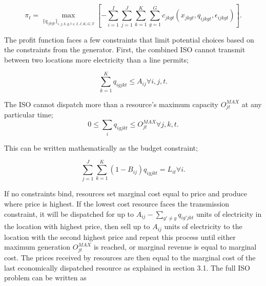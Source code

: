 \documentclass[12pt]{article}
\begin{document}
\begin{equation}
\pi_{t}=\max_{\{q_{ijkgt}\}_{i,j,k,g,t\in I,J,K,G,T}} [-\sum_{i=1}^I\sum_{j=1}^J \sum_{k=1}^K \sum_{g=1}^G c_{jkgt}(x_{jkgt},q_{ijkgt},\epsilon_{ijkgt})].
\end{equation}

The profit function faces a few constraints that limit potential choices based on the constraints from the generator. First, the combined ISO cannot transmit between two locations more electricity than a line permits;
 
 \begin{equation}
    \sum_{k=1}^K q_{igjkt}\leq A_{ij} \forall i,j,t.
 \end{equation}

\noindent The ISO cannot dispatch more than a resource's maximum capacity $O_{jt}^{MAX}$ at any particular time;
  \begin{equation}
     0\leq \sum_{i} q_{igjkt}\leq O_{jt}^{MAX} \forall j,k,t.
 \end{equation}

This can be written mathematically as the budget constraint;
 
  \begin{equation}\label{Budget_Constraint}
     \sum_{j=1}^J\sum_{k=1}^K (1-B_{ij})q_{igjkt}=L_{it} \forall i.
 \end{equation}



If no constraints bind, resources set marginal cost equal to price and produce where price is highest. If the lowest cost resource faces the transmission constraint, it will be dispatched for up to $A_{ij}-\sum_{g'\neq g} q_{ig'jkt}$ units of electricity in the location with highest price, then sell up to $A_{ij}$ units of electricity to the location with the second highest price and repeat this process until either maximum generation $O_{jt}^{MAX}$ is reached, or marginal revenue is equal to marginal cost. The prices received by resources are then equal to the marginal cost of the last economically dispatched resource as explained in section 3.1. The full ISO problem can be written as
\end{document}
